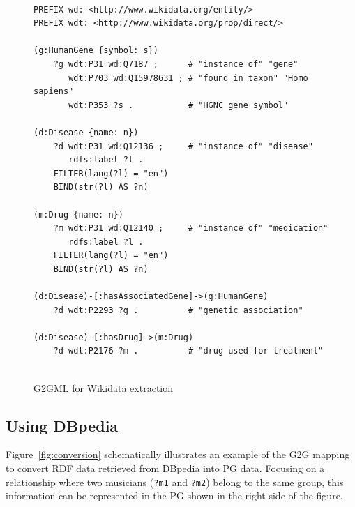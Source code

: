 \documentclass[runningheads]{llncs}
\begin{document}
\begin{figure}[!t]
\vspace{2mm}
\begin{scriptsize}
\begin{verbatim}
 
PREFIX wd: <http://www.wikidata.org/entity/>
PREFIX wdt: <http://www.wikidata.org/prop/direct/>
 
(g:HumanGene {symbol: s})
    ?g wdt:P31 wd:Q7187 ;      # "instance of" "gene"
       wdt:P703 wd:Q15978631 ; # "found in taxon" "Homo sapiens"
       wdt:P353 ?s .           # "HGNC gene symbol"
 
(d:Disease {name: n})
    ?d wdt:P31 wd:Q12136 ;     # "instance of" "disease"
       rdfs:label ?l .
    FILTER(lang(?l) = "en")
    BIND(str(?l) AS ?n)
 
(m:Drug {name: n})
    ?m wdt:P31 wd:Q12140 ;     # "instance of" "medication"
       rdfs:label ?l .
    FILTER(lang(?l) = "en")
    BIND(str(?l) AS ?n)
 
(d:Disease)-[:hasAssociatedGene]->(g:HumanGene)
    ?d wdt:P2293 ?g .          # "genetic association"
 
(d:Disease)-[:hasDrug]->(m:Drug)
    ?d wdt:P2176 ?m .          # "drug used for treatment"
 
\end{verbatim}
\end{scriptsize}
\caption{G2GML for Wikidata extraction}
\label{fig:g2gml_wikidata}
\end{figure}
 
 
\subsection{Using DBpedia}
 
Figure~\ref{fig:conversion} schematically illustrates an example of the G2G mapping to convert RDF data retrieved from DBpedia into PG data. 
Focusing on a relationship where two musicians (\texttt{?m1} and \texttt{?m2}) belong to the same group, this information can be represented in the PG shown in the right side of the figure.
 
\end{document}
